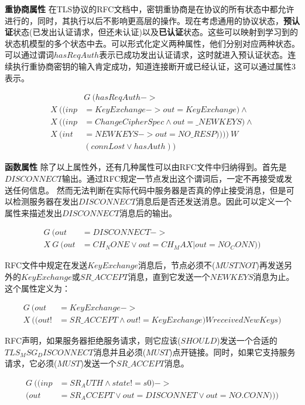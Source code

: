 \textbf{重协商属性}
在TLS协议的RFC文档中，密钥重协商是在协议的所有状态中都允许进行的，同时，其执行以后不影响更高层的操作。现在考虑通用的协议状态，\textbf{预认证}状态(已发出认证请求，但还未认证)以及\textbf{已认证}状态。这些可以映射到学习到的状态机模型的多个状态中去。可以形式化定义两种属性，他们分别对应两种状态。可以通过谓词$hasReqAuth$表示已成功发出认证请求，这时就进入预认证状态。连续执行重协商密钥的输入肯定成功，知道连接断开或已经认证，这可以通过属性3表示。

\begin{PROPERTY}
\[
\begin{aligned}
&G\ ( hasReqAuth  ->\\
X\ ( (inp &= KeyExchange -> out = KeyExchange) \wedge\\
X\ ( (inp &= ChangeCipherSpec \wedge out = \_NEWKEYS)\wedge\\
X\ (int &= NEWKEYS -> out = NO\_RESP)))) \ W\\
&(connLost \vee hasAuth))
\end{aligned}
\]
\end{PROPERTY}

\textbf{函数属性}
除了以上属性外，还有几种属性可以由RFC文件中归纳得到。首先是$DISCONNECT$输出。通过RFC规定一节点发出这个谓词后，一定不再接受或发送任何信息。
然而无法判断在实际代码中服务器是否真的停止接受消息，但是可以检测服务器在发出$DISCONNECT$消息后是否还发送消息。因此可以定义一个属性来描述发出$DISCONNECT$消息后的输出。
\begin{PROPERTY}
\[
\begin{aligned}
G\ ( out &= DISCONNECT ->\\
X\ G\ (out &= CH_NONE \vee out = CH_MAX | out = NO_CONN))
\end{aligned}
\]
\end{PROPERTY}

RFC文件中规定在发送$KeyExchange$消息后，节点必须不($MUST NOT$)再发送另外的$KeyExchange$或$SR\_ACCEPT$消息，直到它发送一个$NEWKEYS$消息为止。
这个属性定义为：
\begin{PROPERTY}
\[
\begin{aligned}
G\ ( out &= KeyExchange ->\\
X\ ( (out !&= SR\_ACCEPT \wedge out != KeyExchange) W receivedNewKeys)
\end{aligned}
\]
\end{PROPERTY}

RFC声明，如果服务器拒绝服务请求，则它应该($SHOULD$)发送一个合适的$TLS_MSG_DISCONNECT$消息并且必须($MUST$)点开链接。同时，如果它支持服务请求，它必须($MUST$)发送一个$SR\_ACCEPT$消息。
\begin{PROPERTY}
\[
\begin{aligned}
G\ ( (inp &= SR_AUTH \wedge state != s0) ->\\
(out &= SR_ACCEPT \vee out = DISCONNET \vee out = NO.CONN)))
\end{aligned}
\]
\end{PROPERTY}


